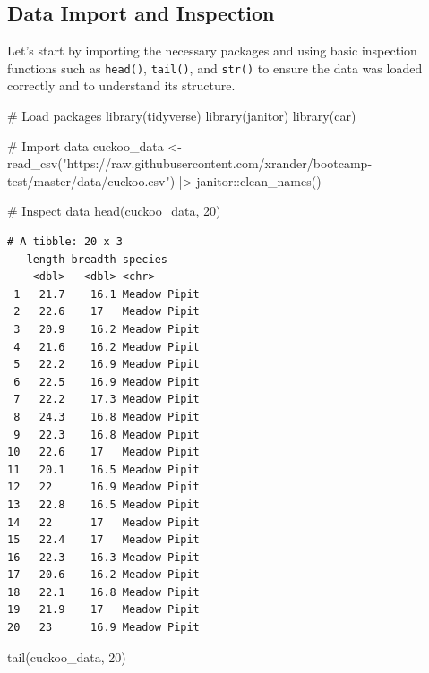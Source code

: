 \documentclass[
  letterpaper,
  DIV=11,
  numbers=noendperiod]{scrartcl}
\newenvironment{Shaded}{\begin{snugshade}}{\end{snugshade}}
\newcommand{\CommentTok}[1]{\textcolor[rgb]{0.37,0.37,0.37}{#1}}
\newcommand{\DecValTok}[1]{\textcolor[rgb]{0.68,0.00,0.00}{#1}}
\newcommand{\FunctionTok}[1]{\textcolor[rgb]{0.28,0.35,0.67}{#1}}
\newcommand{\NormalTok}[1]{\textcolor[rgb]{0.00,0.23,0.31}{#1}}
\newcommand{\OtherTok}[1]{\textcolor[rgb]{0.00,0.23,0.31}{#1}}
\newcommand{\SpecialCharTok}[1]{\textcolor[rgb]{0.37,0.37,0.37}{#1}}
\newcommand{\StringTok}[1]{\textcolor[rgb]{0.13,0.47,0.30}{#1}}
\begin{document}
\subsection{Data Import and
Inspection}\label{data-import-and-inspection}

Let's start by importing the necessary packages and using basic
inspection functions such as \texttt{head()}, \texttt{tail()}, and
\texttt{str()} to ensure the data was loaded correctly and to understand
its structure.

\begin{Shaded}
\begin{Highlighting}[]
\CommentTok{\# Load packages}
\FunctionTok{library}\NormalTok{(tidyverse)}
\FunctionTok{library}\NormalTok{(janitor)}
\FunctionTok{library}\NormalTok{(car)}

\CommentTok{\# Import data}
\NormalTok{cuckoo\_data }\OtherTok{\textless{}{-}} \FunctionTok{read\_csv}\NormalTok{(}\StringTok{"https://raw.githubusercontent.com/xrander/bootcamp{-}test/master/data/cuckoo.csv"}\NormalTok{) }\SpecialCharTok{|\textgreater{}} 
\NormalTok{  janitor}\SpecialCharTok{::}\FunctionTok{clean\_names}\NormalTok{()}

\CommentTok{\# Inspect data}
\FunctionTok{head}\NormalTok{(cuckoo\_data, }\DecValTok{20}\NormalTok{)}
\end{Highlighting}
\end{Shaded}

\begin{verbatim}
# A tibble: 20 x 3
   length breadth species     
    <dbl>   <dbl> <chr>       
 1   21.7    16.1 Meadow Pipit
 2   22.6    17   Meadow Pipit
 3   20.9    16.2 Meadow Pipit
 4   21.6    16.2 Meadow Pipit
 5   22.2    16.9 Meadow Pipit
 6   22.5    16.9 Meadow Pipit
 7   22.2    17.3 Meadow Pipit
 8   24.3    16.8 Meadow Pipit
 9   22.3    16.8 Meadow Pipit
10   22.6    17   Meadow Pipit
11   20.1    16.5 Meadow Pipit
12   22      16.9 Meadow Pipit
13   22.8    16.5 Meadow Pipit
14   22      17   Meadow Pipit
15   22.4    17   Meadow Pipit
16   22.3    16.3 Meadow Pipit
17   20.6    16.2 Meadow Pipit
18   22.1    16.8 Meadow Pipit
19   21.9    17   Meadow Pipit
20   23      16.9 Meadow Pipit
\end{verbatim}

\begin{Shaded}
\begin{Highlighting}[]
\FunctionTok{tail}\NormalTok{(cuckoo\_data, }\DecValTok{20}\NormalTok{)}
\end{Highlighting}
\end{Shaded}
\end{document}
